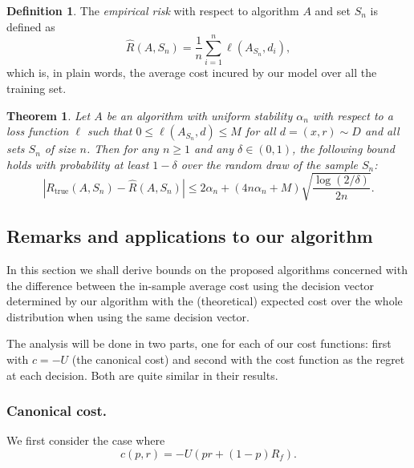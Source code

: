 \documentclass[11pt]{article}
\newcommand{\trueRisk}{R_{\mathrm{true}}}
\theoremstyle{plain}
\newtheorem{thm}{Theorem}
\theoremstyle{definition}
\newtheorem*{deff}{Definition}
\begin{document}
\begin{deff}
  The \emph{empirical risk} with respect to algorithm $A$ and set $S_n$ is defined as
  \begin{equation}
    \hat R(A,S_n) = \frac{1}{n} \sum_{i=1}^n \ell(A_{S_n},d_i),
  \end{equation}
  which is, in plain words, the average cost incured by our model over all the training
  set.
\end{deff}

\begin{thm}
  \label{thm2}
  Let $A$ be an algorithm with uniform stability $\alpha_n$ with respect to a loss
  function $\ell$ such that $0\leq\ell(A_{S_n},d)\leq M$ for all $d=(x,r)\sim D$ and all sets
  $S_n$ of size $n$. Then for any $n\geq1$ and any $\delta\in(0,1)$, the following bound
  holds with probability at least $1-\delta$ over the random draw of the sample $S_n$:
  \begin{equation}
    |\trueRisk(A,S_n) - \hat R(A,S_n)| \leq 2\alpha_n + (4n\alpha_n + M) \sqrt{\frac{\log(2/\delta)}{2n}}.
  \end{equation}
\end{thm}

\subsection{Remarks and applications to our algorithm}

In this section we shall derive bounds on the proposed algorithms concerned with the
difference between the in-sample average cost using the decision vector determined by our
algorithm with the (theoretical) expected cost over the whole distribution when using the
same decision vector. 

The analysis will be done in two parts, one for each of our cost functions: first with
$c=-U$ (the canonical cost) and second with the cost function as the regret at each
decision. Both are quite similar in their results. 

\subsubsection{Canonical cost.}

We first consider the case where 
\begin{equation}
  c(p,r) = -U(pr + (1-p)R_f).
\end{equation}
\end{document}
